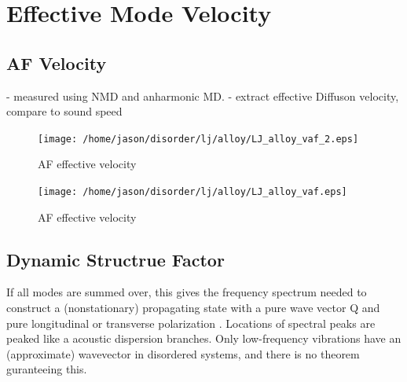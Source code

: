 \documentclass[aps,prb,preprint,superscriptaddress,amsmath,amssymb,floatfix]{revtex4}
\begin{document}
\section{\label{S:GroupVeloctiy}Effective Mode Velocity}

\subsection{\label{S-Motivation-Amorphous}AF Velocity}
- measured using NMD and anharmonic MD.
- extract effective Diffuson velocity, compare to sound speed

\begin{figure}
\begin{center}
\texttt{[image: /home/jason/disorder/lj/alloy/LJ\_alloy\_vaf\_2.eps]}
\vspace*{-5mm}
\end{center}
\caption{\label{FIG:phonon_diff} AF effective velocity}
\end{figure}

\begin{figure}
\begin{center}
\texttt{[image: /home/jason/disorder/lj/alloy/LJ\_alloy\_vaf.eps]}
\vspace*{-5mm}
\end{center}
\caption{\label{FIG:phonon_diff} AF effective velocity}
\end{figure}

\vspace*{100mm}

\subsection{\label{S:Lifetimes:}Dynamic Structrue Factor}
If all modes are summed over, this gives the frequency spectrum
needed to construct a (nonstationary) propagating state with a
pure wave vector Q and pure longitudinal or transverse polarization
 \cite{feldman_thermal_1993}. Locations of spectral peaks are peaked 
like a acoustic dispersion branches. Only low-frequency vibrations 
have an (approximate) wavevector in disordered systems, and there is 
no theorem guranteeing this. \cite{feldman_numerical_1999}
\end{document}
